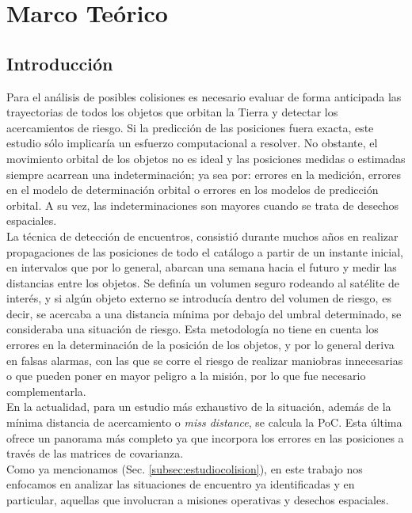 \chapter{Marco Teórico}
\label{chap:marcoteorico}

\section{Introducci\'on}

Para el an\'alisis de posibles colisiones es necesario evaluar de forma anticipada las trayectorias de todos los objetos que orbitan la Tierra y detectar los acercamientos de riesgo. Si la predicci\'on de las posiciones fuera exacta, este estudio s\'olo implicar\'ia un esfuerzo computacional a resolver. No obstante, el movimiento orbital de los objetos no es ideal y las posiciones medidas o estimadas siempre acarrean una indeterminaci\'on; ya sea por: errores en la medici\'on, errores en el modelo de determinaci\'on orbital o errores en los modelos de predicci\'on orbital. A su vez, las indeterminaciones son mayores cuando se trata de desechos espaciales.\\

La t\'ecnica de detecci\'on de encuentros, consisti\'o durante muchos a\~nos en realizar propagaciones de las posiciones de todo el cat\'alogo a partir de un instante inicial, en intervalos que por lo general, abarcan una semana hacia el futuro y medir las distancias entre los objetos. Se defin\'ia un volumen seguro rodeando al sat\'elite de inter\'es, y si alg\'un objeto externo se introduc\'ia dentro del volumen de riesgo, es decir, se acercaba a una distancia m\'inima por debajo del umbral determinado, se consideraba una situaci\'on de riesgo. 
Esta metodolog\'ia no tiene en cuenta los errores en la determinaci\'on de la posici\'on de los objetos, y por lo general deriva en falsas alarmas, con las que se corre el riesgo de realizar maniobras innecesarias o que pueden poner en mayor peligro a la misi\'on, por lo que fue necesario complementarla.\\

En la actualidad, para un estudio m\'as exhaustivo de la situaci\'on, adem\'as de la m\'inima distancia de acercamiento o {\it{miss distance}}, se calcula la PoC.  Esta \'ultima ofrece un panorama m\'as completo ya que incorpora los errores en las posiciones a trav\'es de las matrices de covarianza.\\

Como ya mencionamos (Sec. \ref{subsec:estudiocolision}), en este trabajo nos enfocamos en analizar las situaciones de encuentro ya identificadas y en particular, aquellas que involucran a misiones operativas y desechos espaciales.\\

